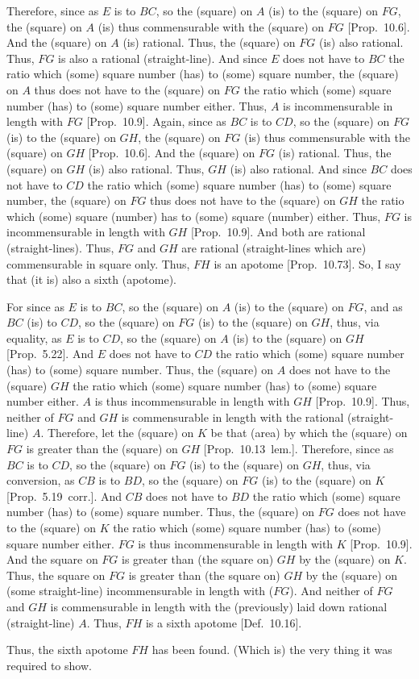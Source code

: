 \begin{Parallel}{}{}
{Therefore, since as $E$ is to $BC$, so the (square) on $A$ (is)
to the (square) on $FG$, the (square) on $A$ (is) thus commensurable
with the (square) on $FG$ [Prop.~10.6]. 
And the (square) on $A$ (is) rational. Thus, the (square) on $FG$
(is) also rational. Thus, $FG$  is also a rational (straight-line). And
since $E$ does not have to $BC$ the ratio which (some) square
number (has) to (some) square number, the (square) on $A$
thus does not have to the (square) on $FG$ the ratio which (some)
square number (has) to (some) square number either. Thus,
$A$ is incommensurable in length with $FG$ [Prop.~10.9]. Again, since as $BC$ is to $CD$, so
the (square) on $FG$ (is) to the (square) on $GH$, the (square) on
$FG$ (is) thus commensurable with the (square) on $GH$ [Prop.~10.6]. And the (square) on $FG$ (is) rational.
Thus, the (square) on $GH$ (is) also rational. Thus, $GH$
(is) also rational. And since $BC$ does not have to $CD$ the ratio
which (some) square number (has) to (some) square number, the
(square) on $FG$ thus does not have to the (square) on $GH$
the ratio which (some) square (number) has to (some) square (number)
either. Thus, $FG$ is incommensurable in length with $GH$ [Prop.~10.9]. And both are rational (straight-lines).
Thus, $FG$ and $GH$ are rational (straight-lines which are) commensurable
in square only. Thus, $FH$ is an apotome [Prop.~10.73]. So, I say that (it is) also a sixth (apotome).

For since as $E$ is to $BC$, so the (square) on $A$ (is) to the (square)
on $FG$, and as $BC$ (is) to $CD$, so the (square) on $FG$ (is) to
the (square) on $GH$, thus, via equality, as $E$ is to $CD$, so the
(square) on $A$ (is) to the (square) on $GH$ [Prop.~5.22]. And $E$ does not have to $CD$
the ratio which (some) square number (has) to (some) square number.
Thus, the (square) on $A$ does not have to the (square) $GH$ the
ratio which (some) square number (has) to (some) square number either. $A$ is thus incommensurable in length with $GH$ [Prop.~10.9]. Thus, neither of $FG$ and $GH$
is commensurable in length with the rational (straight-line) $A$. Therefore, let the (square)
on $K$ be that (area) by which the (square) on $FG$ is greater than the (square) on $GH$ [Prop.~10.13~lem.].
 Therefore, since as $BC$ is to $CD$, so the (square) on $FG$ (is) to the
(square) on $GH$, thus, via conversion, as $CB$ is to $BD$, so the (square)
on $FG$ (is) to the (square) on $K$ [Prop.~5.19~corr.]. And $CB$ does not have
to $BD$ the ratio which (some) square number (has) to (some) square
number. Thus, the (square) on $FG$ does not have to the (square) on
$K$ the ratio which (some) square number (has) to (some) square number
either. $FG$ is thus incommensurable in length with $K$ [Prop.~10.9]. And the square on $FG$ is greater
than (the square on) $GH$ by the (square) on $K$.
Thus, the square on
$FG$ is greater than (the square on) $GH$ by the (square)
on (some straight-line) incommensurable in length with ($FG$).
And neither of $FG$ and $GH$ is commensurable in length
with the (previously) laid down rational (straight-line) $A$. Thus,
$FH$ is a sixth apotome [Def.~10.16].

Thus, the sixth apotome $FH$ has been found. (Which is) the
very thing it was required to show.}
\end{Parallel}
